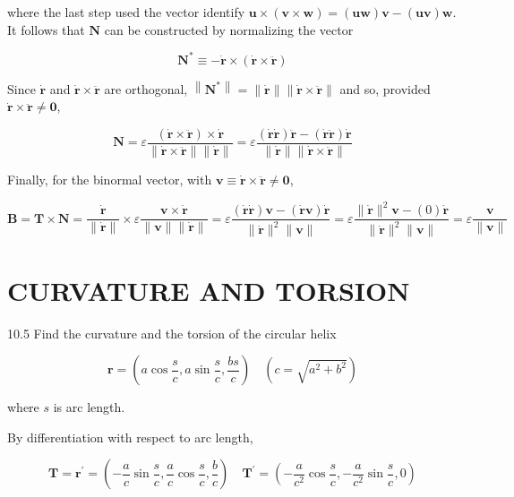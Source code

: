 \documentclass[10pt]{article}
\begin{document}
where the last step used the vector identify $\mathbf{u} \times(\mathbf{v} \times \mathbf{w})=(\mathbf{u w}) \mathbf{v}-(\mathbf{u v}) \mathbf{w}$. It follows that $\mathbf{N}$ can be constructed by normalizing the vector

$$
\mathbf{N}^{*} \equiv-\dot{\mathbf{r}} \times(\dot{\mathbf{r}} \times \ddot{\mathbf{r}})
$$

Since $\dot{\mathbf{r}}$ and $\dot{\mathbf{r}} \times \ddot{\mathbf{r}}$ are orthogonal, $\left\|\mathbf{N}^{*}\right\|=\|\dot{\mathbf{r}}\|\|\dot{\mathbf{r}} \times \ddot{\mathbf{r}}\|$ and so, provided $\dot{\mathbf{r}} \times \ddot{\mathbf{r}} \neq \mathbf{0}$,

$$
\mathbf{N}=\varepsilon \frac{(\dot{\mathbf{r}} \times \ddot{\mathbf{r}}) \times \dot{\mathbf{r}}}{\|\dot{\mathbf{r}} \times \ddot{\mathbf{r}}\|\|\dot{\mathbf{r}}\|}=\varepsilon \frac{(\dot{\mathbf{r}} \dot{\mathbf{r}}) \ddot{\mathbf{r}}-(\dot{\mathbf{r}} \ddot{\mathbf{r}}) \dot{\mathbf{r}}}{\|\dot{\mathbf{r}}\|\|\dot{\mathbf{r}} \times \ddot{\mathbf{r}}\|}
$$

Finally, for the binormal vector, with $\mathbf{v} \equiv \dot{\mathbf{r}} \times \ddot{\mathbf{r}} \neq \mathbf{0}$,

$$
\mathbf{B}=\mathbf{T} \times \mathbf{N}=\frac{\dot{\mathbf{r}}}{\|\dot{\mathbf{r}}\|} \times \varepsilon \frac{\mathbf{v} \times \dot{\mathbf{r}}}{\|\mathbf{v}\|\|\dot{\mathbf{r}}\|}=\varepsilon \frac{(\dot{\mathbf{r}} \dot{\mathbf{r}}) \mathbf{v}-(\dot{\mathbf{r}} \mathbf{v}) \dot{\mathbf{r}}}{\|\dot{\mathbf{r}}\|^{2}\|\mathbf{v}\|}=\varepsilon \frac{\|\dot{\mathbf{r}}\|^{2} \mathbf{v}-(0) \dot{\mathbf{r}}}{\|\dot{\mathbf{r}}\|^{2}\|\mathbf{v}\|}=\varepsilon \frac{\mathbf{v}}{\|\mathbf{v}\|}
$$

\section*{CURVATURE AND TORSION}
10.5 Find the curvature and the torsion of the circular helix

$$
\mathbf{r}=\left(a \cos \frac{s}{c}, a \sin \frac{s}{c}, \frac{b s}{c}\right) \quad\left(c=\sqrt{a^{2}+b^{2}}\right)
$$

where $s$ is arc length.

By differentiation with respect to arc length,

$$
\mathbf{T}=\mathbf{r}^{\prime}=\left(-\frac{a}{c} \sin \frac{s}{c}, \frac{a}{c} \cos \frac{s}{c}, \frac{b}{c}\right) \quad \mathbf{T}^{\prime}=\left(-\frac{a}{c^{2}} \cos \frac{s}{c},-\frac{a}{c^{2}} \sin \frac{s}{c}, 0\right)
$$
\end{document}
